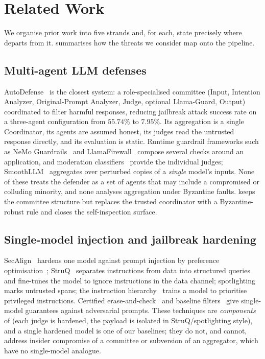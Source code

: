 \section{Related Work}
\label{sec:related}

We organise prior work into five strands and, for each, state precisely where \Aegis
departs from it.  summarises how the threats we consider map onto the
pipeline.

\subsection{Multi-agent LLM defenses}
AutoDefense~\cite{zeng2024autodefense} is the closest system: a role-specialised
committee (Input, Intention Analyzer, Original-Prompt Analyzer, Judge, optional
Llama-Guard, Output) coordinated to filter harmful responses, reducing jailbreak attack
success rate on a three-agent configuration from $55.74\%$ to $7.95\%$. Its aggregation
is a single Coordinator, its agents are assumed honest, its judges read the untrusted
response directly, and its evaluation is static. Runtime guardrail frameworks such as
NeMo Guardrails~\cite{rebedea2023nemo} and LlamaFirewall~\cite{chennabasappa2025llamafirewall}
compose several checks around an application, and moderation
classifiers~\cite{inan2023llamaguard,markov2023holistic,zeng2024shieldgemma} provide the
individual judges; SmoothLLM~\cite{robey2023smoothllm} aggregates over perturbed copies
of a \emph{single} model's inputs. None of these treats the defender as a set of agents
that may include a compromised or colluding minority, and none analyses aggregation
under Byzantine faults. \Aegis keeps the committee structure but replaces the trusted
coordinator with a Byzantine-robust rule and closes the self-inspection surface.

\subsection{Single-model injection and jailbreak hardening}
SecAlign~\cite{chen2025secalign} hardens one model against prompt injection by
preference optimisation~\cite{rafailov2023dpo}; StruQ~\cite{chen2024struq} separates
instructions from data into structured queries and fine-tunes the model to ignore
instructions in the data channel; spotlighting~\cite{hines2024spotlighting} marks
untrusted spans; the instruction hierarchy~\cite{wallace2024instruction} trains a model
to prioritise privileged instructions. Certified erase-and-check~\cite{kumar2023certifying}
and baseline filters~\cite{jain2023baseline} give single-model guarantees against
adversarial prompts. These techniques are \emph{components} of \Aegis (each judge is
hardened, the payload is isolated in StruQ/spotlighting style), and a single hardened
model is one of our baselines; they do not, and cannot, address insider compromise of a
committee or subversion of an aggregator, which have no single-model analogue.

